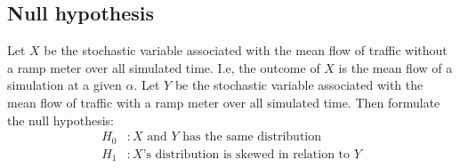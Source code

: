 \documentclass{article}
\begin{document}
  \subsection{Null hypothesis}
    Let $X$ be the stochastic variable associated with the mean flow of traffic
    without a ramp meter over all simulated time.
    I.e, the outcome of $X$ is the mean flow of a simulation at a given
    $\alpha$. Let $Y$ be the stochastic variable associated with the mean flow of traffic
    with a ramp meter over all simulated time. Then formulate the null hypothesis:
    \begin{equation}
      \begin{split}
        H_{0} & : X \textrm{ and } Y \textrm{ has the same distribution}\\
        H_{1} & : X\textrm{'s distribution is skewed in relation to } Y
      \end{split}
      \label{eq:null}
    \end{equation}
\end{document}
